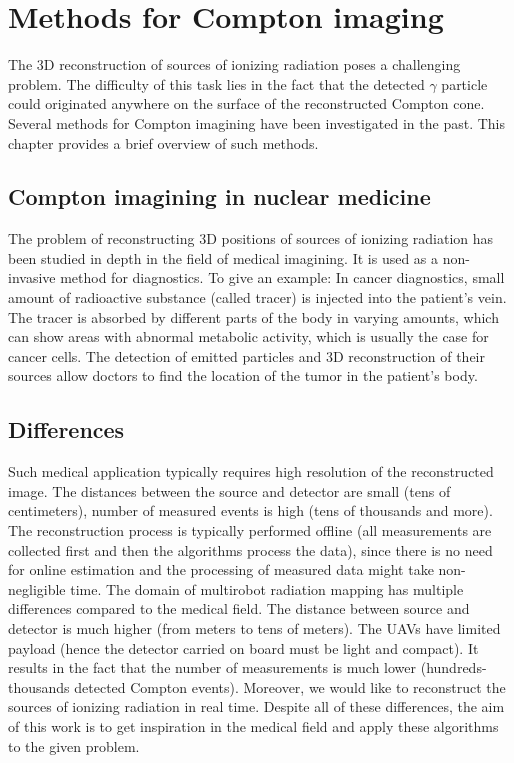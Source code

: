 \chapter{Methods for Compton imaging\label{chap:mlem_theory}}
The 3D reconstruction of sources of ionizing radiation poses a challenging problem.
The difficulty of this task lies in the fact that the detected $\gamma$ particle could originated anywhere on the surface of the reconstructed Compton cone.
Several methods for Compton imagining have been investigated in the past.
This chapter provides a brief overview of such methods.

\section{Compton imagining in nuclear medicine}
The problem of reconstructing 3D positions of sources of ionizing radiation has been studied in depth in the field of medical imagining.
It is used as a non-invasive method for diagnostics.
To give an example:
In cancer diagnostics, small amount of radioactive substance (called tracer) is injected into the patient's vein.
The tracer is absorbed by different parts of the body in varying amounts, which can show areas with abnormal metabolic activity, which is usually the case for cancer cells.
The detection of emitted particles and 3D reconstruction of their sources allow doctors to find the location of the tumor in the patient's body.

\section{Differences}
Such medical application typically requires high resolution of the reconstructed image.
The distances between the source and detector are small (tens of centimeters), number of measured events is high (tens of thousands and more).
The reconstruction process is typically performed offline (all measurements are collected first and then the algorithms process the data), since there is no need for online estimation and the processing of measured data might take non-negligible time.
The domain of multirobot radiation mapping has multiple differences compared to the medical field.
The distance between source and detector is much higher (from meters to tens of meters).
The \ac{UAV}s have limited payload (hence the detector carried on board must be light and compact).
It results in the fact that the number of measurements is much lower (hundreds-thousands detected Compton events).
Moreover, we would like to reconstruct the sources of ionizing radiation in real time.
Despite all of these differences, the aim of this work is to get inspiration in the medical field and apply these algorithms to the given problem.


